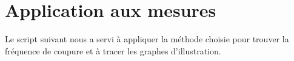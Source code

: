 \section{Application aux mesures}

Le script suivant nous a servi à appliquer la méthode choisie
pour trouver la fréquence de coupure et à tracer les graphes
d'illustration.


